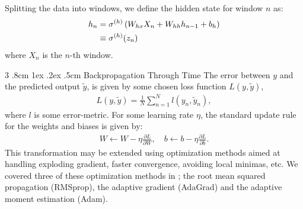 \documentclass[%
reprint,
amsmath,amssymb,
aps,
]{revtex4-2}
\makeatletter
\renewcommand{\subsubsection}{%
	\@startsection
	{subsubsection}%
	{3}%
	{\z@}%
	{.8cm \@plus1ex \@minus .2ex}%
	{.5cm}%
	{\normalfont\small\centering}%
}
\makeatother
\begin{document}
Splitting the data into windows, we define the hidden state for window \(n\) as:
\begin{align}
	h_{n} &= \sigma^{(h)}\left( W_{hx}X_{n} + W_{hh}h_{n-1} + b_{h} \right) \notag \\
	&\equiv \sigma^{(h)}(z_{n})
\end{align}
where \(X_{n}\) is the \(n\)-th window.

\subsubsection{Backpropagation Through Time}
The error between \(y\) and the predicted output \(\tilde{y}\), is given by some chosen loss function \(L(y, \tilde{y})\),
\begin{align}	
	L(y,\tilde{y}) = \frac{1}{N}\sum\limits_{n=1}^{N} l(y_{n}, \tilde{y}_n),
\end{align}
where \(l\) is some error-metric. 
For some learning rate \(\eta\), the standard update rule for the weights and biases is given by:
\begin{align}	\label{eq:learning_rate}
	W\leftarrow W-\eta \frac{\partial L}{\partial W},\quad b\leftarrow b-\eta \frac{\partial L}{\partial b}.
\end{align}
This transformation may be extended using optimization methods aimed at handling exploding gradient, faster convergence, avoiding local minimas, etc. We covered three of these optimization methods in \cite{project2}; the root mean squared propagation (RMSprop), the adaptive gradient (AdaGrad) and the adaptive moment estimation (Adam). 
\end{document}
